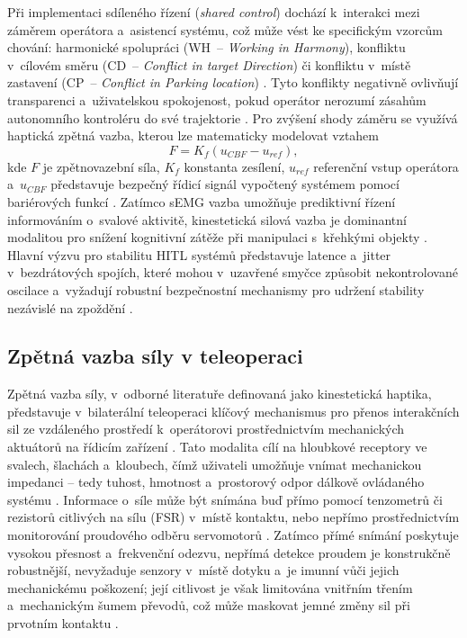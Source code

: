Při implementaci sdíleného řízení (\textit{shared control}) dochází k~interakci mezi záměrem operátora a~asistencí systému, což může vést ke specifickým vzorcům chování: harmonické spolupráci (WH~-- \textit{Working in Harmony}), konfliktu v~cílovém směru (CD~-- \textit{Conflict in target Direction}) či konfliktu v~místě zastavení (CP~-- \textit{Conflict in Parking location}) \cite{AlSaadi2023313}.
Tyto konflikty negativně ovlivňují transparenci a~uživatelskou spokojenost, pokud operátor nerozumí zásahům autonomního kontroléru do své trajektorie \cite{Zhang2021530}.
Pro zvýšení shody záměru se využívá haptická zpětná vazba, kterou lze matematicky modelovat vztahem
%
\begin{equation}
    F = K_f \left(u_{CBF} - u_{ref}\right),
\end{equation}
%
kde $F$ je zpětnovazební síla, $K_f$ konstanta zesílení, $u_{ref}$ referenční vstup operátora a~$u_{CBF}$ představuje bezpečný řídicí signál vypočtený systémem pomocí bariérových funkcí \cite{Zhang2021530}.
Zatímco sEMG vazba umožňuje prediktivní řízení informováním o~svalové aktivitě, kinestetická silová vazba je dominantní modalitou pro snížení kognitivní zátěže při manipulaci s~křehkými objekty \cite{Xiong2024, Thomas2023110, GIUDICI2025, Ninu2014}.
Hlavní výzvu pro stabilitu HITL systémů představuje latence a~jitter v~bezdrátových spojích, které mohou v~uzavřené smyčce způsobit nekontrolované oscilace a~vyžadují robustní bezpečnostní mechanismy pro udržení stability nezávislé na zpoždění \cite{Aijaz2018, Suman2025, GIUDICI2025, Black2025}.

\subsection{Zpětná vazba síly v teleoperaci}
Zpětná vazba síly, v~odborné literatuře definovaná jako kinestetická haptika, představuje v~bilaterální teleoperaci klíčový mechanismus pro přenos interakčních sil ze vzdáleného prostředí k~operátorovi prostřednictvím mechanických aktuátorů na řídicím zařízení \cite{GIUDICI2025, Patel2022, Park2022}.
Tato modalita cílí na hloubkové receptory ve svalech, šlachách a~kloubech, čímž uživateli umožňuje vnímat mechanickou impedanci -- tedy tuhost, hmotnost a~prostorový odpor dálkově ovládaného systému \cite{Yang2025, GIUDICI2025, Li2025}.
Informace o~síle může být snímána buď přímo pomocí tenzometrů či rezistorů citlivých na sílu (FSR) v~místě kontaktu, nebo nepřímo prostřednictvím monitorování proudového odběru servomotorů \cite{Mohammadi2024418, Patel2022}.
Zatímco přímé snímání poskytuje vysokou přesnost a~frekvenční odezvu, nepřímá detekce proudem je konstrukčně robustnější, nevyžaduje senzory v~místě dotyku a~je imunní vůči jejich mechanickému poškození; její citlivost je však limitována vnitřním třením a~mechanickým šumem převodů, což může maskovat jemné změny sil při prvotním kontaktu \cite{Mohammadi2024418, Patel2022}.

